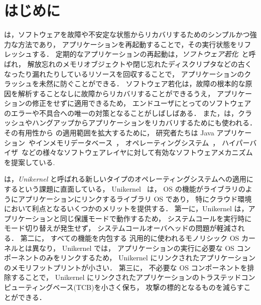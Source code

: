 \section{はじめに} \label{section:introduction}

\rr は，ソフトウェアを故障や不安定な状態からリカバリするためのシンプルかつ強力な方法であり，
アプリケーションを再起動することで，その実行状態をリフレッシュする．
定期的なアプリケーションの再起動は，\emph{ソフトウェア若化}~\cite{HuangEtAl-rejuvenation,CotroneoEtAl-rejuvenation-survey,CotroneoEtAl-Surv14}と呼ばれ，
解放忘れのメモリオブジェクトや閉じ忘れたディスクリプタなどの古くなったり漏れたりしているリソースを回収することで，
アプリケーションのクラッシュを未然に防ぐことができる．
ソフトウェア若化は，故障の根本的な原因を解析することなしに故障からリカバリすることができるうえ，
アプリケーションの修正をせずに適用できるため，
エンドユーザにとってのソフトウェアのエラーや不具合への唯一の対策となることがしばしばある．
また，\rr は，クラッシュやハングアップからアプリケーションをリカバリするためにも使われる．
その有用性から \rr の適用範囲を拡大するために，
研究者たちは Java アプリケーション~\cite{CandeaEtAl-Microreboot}やインメモリデータベース~\cite{JumonjiEtAl-WoSAR17,JumonjiEtAl-IEICE2021}，
オペレーティングシステム~\cite{YamakitaEtAl-PBR,DepoutovitchEtAl-otherworld,KouraiEtAl-cachemind,TeradaEtAl-Dwarf,BovenziEtAl-ISSRE13}，
ハイパーバイザ~\cite{KouraiEtAl-Roothammer,KouraiEtAl-TDSC,LeEtAl-VEE11}などの様々なソフトウェアレイヤに対して有効なソフトウェアメカニズムを提案している.

\rr は，\emph{Unikernel} と呼ばれる新しいタイプのオペレーティングシステムへの適用にするという課題に直面している，
Unikernel ~\cite{MadhavapeddyEtAl-Unikernel,KivityEtAl-OSv,SartakovEtAl-ASPLOS21,KanteeEtAl-rumprun,KuenzerEtAl-Unikraft}は，
OS の機能がライブラリのようにアプリケーションにリンクするライブラリ OS であり，
特にクラウド環境において利点となるいくつかのメリットを提供する．
第一に，Unikernel は，アプリケーションと同じ保護モードで動作するため，
システムコールを実行時にモード切り替えが発生せず，
システムコールオーバヘッドの問題が軽減される．
第二に，
すべての機能を内包する
汎用的に使われるモノリシック OS カーネルとは異なり，
Unikernel では，
アプリケーションの実行に必要な OS コンポーネントのみをリンクするため，
Unikernel にリンクされたアプリケーションのメモリフットプリントが小さい．
第三に，
不必要な OS コンポーネントを排除することで，
Unikernel にリンクされたアプリケーションのトラステッドコンピューティングベース(TCB)を小さく保ち，
攻撃の標的となるものを減らすことができる．

